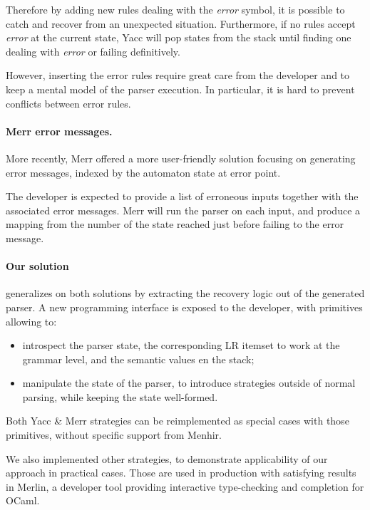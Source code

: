 \documentclass[twoside,a4paper]{article}
\begin{document}
Therefore by adding new rules dealing with the {\em error} symbol, it is
possible to catch and recover from an unexpected situation.  Furthermore, if no
rules accept {\em error} at the current state, Yacc will pop states from the
stack until finding one dealing with {\em error} or failing definitively.

However, inserting the error rules require great care from the developer and to
keep a mental model of the parser execution.  In particular, it is hard to
prevent conflicts between error rules.

\paragraph{Merr error messages.}
More recently, Merr offered a more
user-friendly solution focusing on generating error messages, indexed
by the automaton state at error point.

The developer is expected to provide a list of erroneous inputs together with
the associated error messages.  Merr will run the parser on each input, and
produce a mapping from the number of the state reached just before failing to
the error message.

\paragraph{Our solution} generalizes on both solutions by extracting the
recovery logic out of the generated parser.  A new programming interface is
exposed to the developer, with primitives allowing to:

\begin{itemize}
  \item introspect the parser state, the corresponding LR itemset to work at
    the grammar level, and the semantic values en the stack;
  \item manipulate the state of the parser, to introduce strategies outside of
    normal parsing, while keeping the state well-formed.
\end{itemize}

Both Yacc \& Merr strategies can be reimplemented as special cases with those
primitives, without specific support from Menhir.

We also implemented other strategies, to demonstrate applicability of
our approach in practical cases.  Those are used in production with
satisfying results in Merlin, a developer tool providing
interactive type-checking and completion for OCaml.
\end{document}
